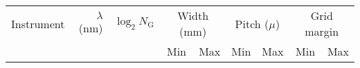 \documentclass{article}
\begin{document}
\begin{tabular}{lrrrrrrrr}
    \hline
    Instrument & $\lambda$ (nm) & $\log_2 N_{\mathrm{G}}$ &
    \multicolumn{2}{c}{Width (mm)}& \multicolumn{2}{c}{Pitch ($\mu$)}
    & \multicolumn{2}{c}{Grid margin}\\
               & & & Min & Max & Min & Max & Min & Max\\
    \hline
\end{tabular}
\end{document}
